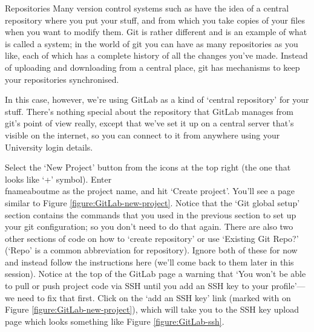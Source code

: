 \begin{diversion}{Repositories}
Many version control systems such as  have the idea of a central repository where you put your stuff, and from which you take copies of your files when you want to modify them. Git is rather different and is an example of what is called a  system; in the world of git you can have as many repositories as you like, each of which has a complete history of all the changes you've made. Instead of uploading and downloading from a central place, git has mechanisms to keep your repositories synchronised. 

In this case, however, we're using GitLab as a kind of `central repository' for your stuff. There's nothing special about the repository that GitLab manages from git's point of view really, except that we've set it up on a central server that's visible on the internet, so you can connect to it from anywhere using your University login details.
\end{diversion}

Select the `New Project' button from the icons at the top right (the one that looks like `+' symbol). Enter \\fname{aboutme} as the project name, and hit `Create project'. You'll see a page similar to Figure \ref{figure:GitLab-new-project}. Notice that the `Git global setup' section contains the commands that you used in the previous section to set up your git configuration; so you don't need to do that again. There are also two other sections of code on how to `create repository' or use `Existing Git Repo?' (`Repo' is a common abbreviation for repository). Ignore both of these for now and instead follow the instructions here (we'll come back to them later in this session). Notice at the top of the GitLab page a warning that `You won't be able to pull or push project code via SSH until you add an SSH key to your profile'---we need to fix that first. Click on the `add an SSH key' link (marked with \protect{} on Figure \ref{figure:GitLab-new-project}), which will take you to the SSH key upload page which looks something like Figure \ref{figure:GitLab-ssh}.

